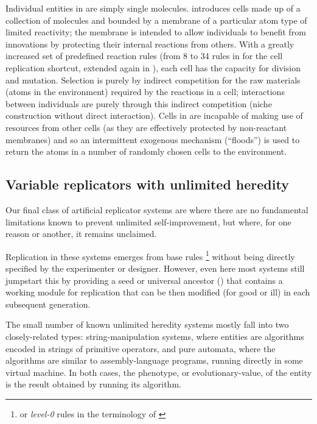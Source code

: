 Individual entities in \textcite{Hutton2002} are simply single molecules. \Textcite{Hutton2007} introduces cells made up of a collection of molecules and bounded by a membrane of a particular atom type of limited reactivity; the membrane is intended to allow individuals to benefit from innovations by protecting their internal reactions from others. With a greatly increased set of predefined reaction rules (from 8 to 34 rules in \textcite{Hutton2007} for the cell replication shortcut, extended again in \textcite{Lucht2012}), each cell has the capacity for division and mutation.  Selection is purely by indirect competition for the raw materials (atoms in the environment) required by the reactions in a cell; interactions between individuals are purely through this indirect competition (niche construction without direct interaction). Cells in \textcite{Hutton2007} are incapable of making use of resources from other cells (as they are effectively protected by non-reactant membranes) and so an intermittent exogenous mechanism (``floods'') is used to return the atoms in a number of randomly chosen cells to the environment.

\subsection{Variable replicators with unlimited heredity}

Our final class of artificial replicator systems are where there are no fundamental limitations known to prevent unlimited self-improvement, but where, for one reason or another, it remains unclaimed.

Replication in these systems emerges from base rules \footnote{or \textit{level-0} rules in the terminology of \textcite{BanzhafBaumgaertnerBeslonEtAl2016}} without being directly specified by the experimenter or designer. However, even here most systems still jumpstart this by providing a seed or universal ancestor (\eg \textcite{Ofria2004}) that contains a working module for replication that can be then modified (for good or ill) in each subsequent generation.

The small number of known unlimited heredity systems mostly fall into two closely-related types: string-manipulation systems, where entities are algorithms encoded in strings of primitive operators, and pure automata, where the algorithms are similar to assembly-language programs, running directly in some virtual machine. In both cases, the phenotype, or evolutionary-value, of the entity is the result obtained by running its algorithm. 


